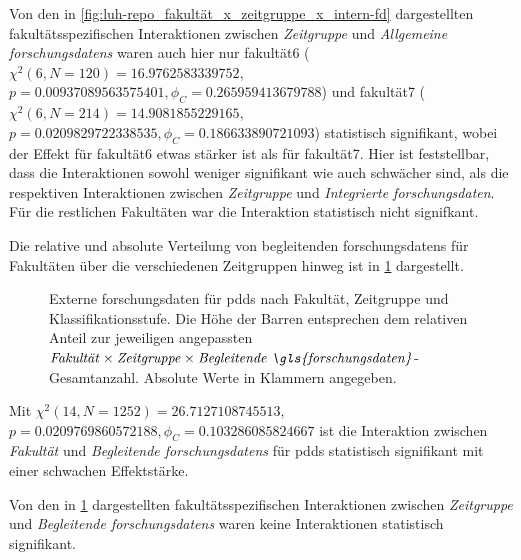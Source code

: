 Von den in \cref{fig:luh-repo_fakultät_x_zeitgruppe_x_intern-fd} dargestellten fakultätsspezifischen Interaktionen zwischen \textit{Zeitgruppe} und \textit{Allgemeine \glspl{forschungsdaten}} waren auch hier nur \gls{fakultät6} ($\chi^2 (\num{6}, N = \num{120}) = \num[round-mode=places,round-precision=2]{16.9762583339752}$, $p = \num[round-mode=places,round-precision=2]{0.00937089563575401},\phi_C=\num[round-mode=places,round-precision=2]{0.265959413679788}$) und \gls{fakultät7} ($\chi^2 (\num{6}, N = \num{214}) = \num[round-mode=places,round-precision=2]{14.9081855229165}$, $p = \num[round-mode=places,round-precision=2]{0.0209829722338535},\phi_C=\num[round-mode=places,round-precision=2]{0.186633890721093}$) statistisch signifikant, wobei der Effekt für \gls{fakultät6} etwas stärker ist als für \gls{fakultät7}.
Hier ist feststellbar, dass die Interaktionen sowohl weniger signifikant wie auch schwächer sind, als die respektiven Interaktionen zwischen \textit{Zeitgruppe} und \textit{Integrierte \gls{forschungsdaten}}.
Für die restlichen Fakultäten war die Interaktion statistisch nicht signifkant.

Die relative und absolute Verteilung von begleitenden \glspl{forschungsdaten} für Fakultäten über die verschiedenen Zeitgruppen hinweg ist in \cref{fig:luh-repo_fakultät_x_zeitgruppe_x_begleit-fd} dargestellt.
\begin{figure}[!htbp]
    \resizebox{\ifdim\width>\textwidth\textwidth\else\width\fi}{!}{}
    \caption{Externe \gls{forschungsdaten} für \glspl{pdd} nach Fakultät, Zeitgruppe und Klassifikationsstufe.
    Die Höhe der Barren entsprechen dem relativen Anteil zur jeweiligen angepassten $\text{\textit{Fakultät}}\times\text{\textit{Zeitgruppe}}\times\text{\textit{Begleitende \gls{forschungsdaten}}}$-Gesamtanzahl.
    Absolute Werte in Klammern angegeben.}
    \label{fig:luh-repo_fakultät_x_zeitgruppe_x_begleit-fd}
\end{figure}
Mit $\chi^2 (\num{14}, N = \num{1252}) = \num[round-mode=places,round-precision=2]{26.7127108745513}$, $p = \num[round-mode=places,round-precision=2]{0.0209769860572188},\phi_C=\num[round-mode=places,round-precision=2]{0.103286085824667}$ ist die Interaktion zwischen \textit{Fakultät} und \textit{Begleitende \glspl{forschungsdaten}} für \glspl{pdd} statistisch signifikant mit einer schwachen Effektstärke.

Von den in \cref{fig:luh-repo_fakultät_x_zeitgruppe_x_begleit-fd} dargestellten fakultätsspezifischen Interaktionen zwischen \textit{Zeitgruppe} und \textit{Begleitende \glspl{forschungsdaten}} waren keine Interaktionen statistisch signifikant.

